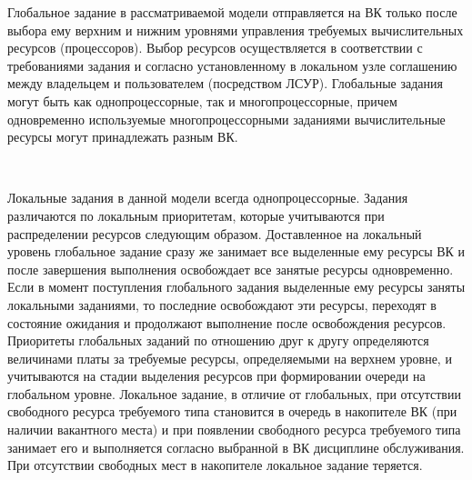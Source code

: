\begin{multicols}{2}
  Глобальное задание в рассматриваемой модели отправляется на ВК только
после выбора ему верхним и нижним уровнями управления требу\-емых
вычислительных ресурсов (процессоров). Выбор ресурсов осуществляется в
соответствии с требованиями задания и согласно установленному в %
 локальном
узле соглашению между владельцем и пользователем (посредством ЛСУР).
Глобальные задания могут быть как однопроцессорные, так и
многопроцессорные, причем одновременно используемые
многопроцессорными заданиями вычислительные ресурсы могут принадлежать
разным ВК. 
\begin{figure*} %
\vspace*{1pt}
\begin{center}
\mbox{%
\epsfxsize=153.317mm %
 }
\end{center}
\vspace*{-9pt} 
  \end{figure*}
Локальные задания в данной модели всегда однопроцессорные.
Задания различаются по локальным приоритетам, которые учитываются при
распределении ресурсов следующим образом. Доставленное на локальный
уровень глобальное задание сразу же занимает все выделенные ему ресурсы ВК
и после завершения выполнения освобождает все занятые ресурсы
одновременно. Если в момент поступления глобального задания выделенные
ему ресурсы заняты локальными заданиями, то последние освобождают эти
ресурсы, переходят в состояние ожидания и продолжают выполнение после
освобождения ресурсов. Приоритеты глобальных заданий по отношению друг к
другу определяются величинами платы за требуемые ресурсы, определяемыми
на верхнем уровне, и учитываются на стадии выделения ресурсов при
формировании очереди на глобальном уровне. Локальное задание, в отличие от
глобальных, при отсутствии свободного ресурса требуемого типа становится в
очередь в накопителе ВК (при наличии вакантного места) и при появлении
свободного ресурса требуемого типа занимает его и выполняется согласно
выбранной в ВК дисциплине обслуживания. При отсутствии свободных мест в
накопителе локальное задание теряется.
{

}


\end{multicols}

